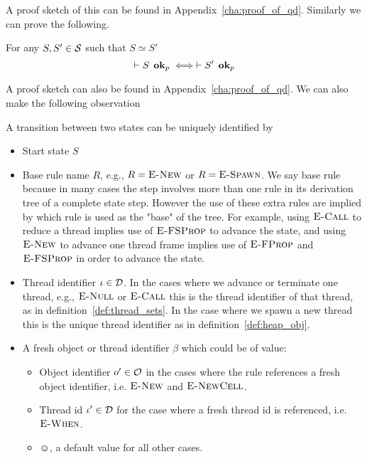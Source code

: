 A proof sketch of this can be found in Appendix~\ref{cha:proof_of_qd}.
Similarly we can prove the following. 
\begin{proposition} \label{prop:eqrel_stateok}
  For any $S, S' \in \mathcal{S}$ such that $S \simeq S'$
  \begin{equation}
    \vdash S \:\: \mbox{{\bf ok}$_p$} \iff \vdash S' \:\: \mbox{{\bf ok}$_p$}
  \end{equation}
\end{proposition}
A proof sketch can also be found in Appendix~\ref{cha:proof_of_qd}.
We can also make the following observation
\begin{claim}
  A transition between two states can be uniquely identified by
  \begin{itemize}
    \item Start state $S$
    \item Base rule name $R$, e.g., $R = \mbox{{\sc E-New}}$ or $R = \mbox{\sc E-Spawn}$. We say base rule
      because in many cases the step involves more than one rule in its
      derivation tree of a complete state step. However the use of these extra
      rules are implied by which rule is used as the "base" of the tree. For
      example, using $\mbox{\sc E-Call}$ to reduce a thread implies use of $\mbox{\sc E-FSProp}$ to
      advance the state, and using $\mbox{{\sc E-New}}$ to advance one thread frame implies
      use of $\mbox{\sc E-FProp}$ and $\mbox{\sc E-FSProp}$ in order to advance the state.
    \item Thread identifier $\iota \in \mathcal{D}$. In the cases where we advance or terminate
      one thread, e.g., $\mbox{{\sc E-Null}}$ or $\mbox{\sc E-Call}$ this is the thread identifier of
      that thread, as in definition~\ref{def:thread_sets}. In the case where we
      spawn a new thread this is the unique thread identifier as in
      definition~\ref{def:heap_obj}.
    \item A fresh object or thread identifier $\beta$ which could be of value:
      \begin{itemize}
        \item Object identifier $o' \in \mathcal{O}$ in the cases where the rule
          references a fresh object identifier, i.e. $\mbox{{\sc E-New}}$ and $\mbox{{\sc E-NewCell}}$.
        \item Thread id $\iota' \in \mathcal{D}$ for the case where a fresh thread id is
          referenced, i.e. $\mbox{{\sc E-When}}$.
        \item $\smiley$, a default value for all other cases.
      \end{itemize}
  \end{itemize}
\end{claim}

